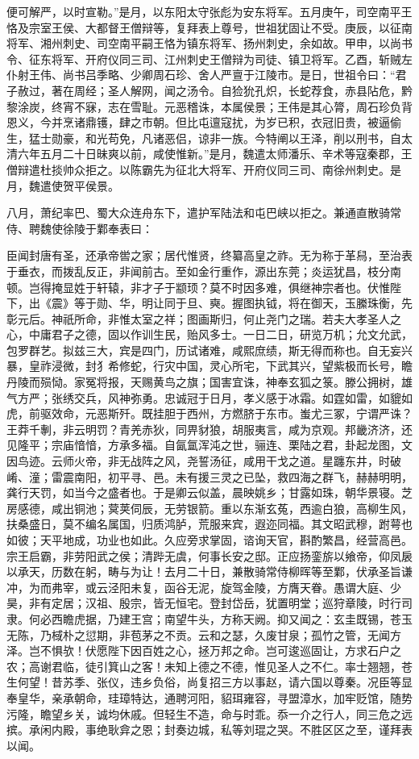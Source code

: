 \documentclass[12pt,UTF8]{ctexbook}
\begin{document}
便可解严，以时宣勒。”是月，以东阳太守张彪为安东将军。五月庚午，司空南平王恪及宗室王侯、大都督王僧辩等，复拜表上尊号，世祖犹固让不受。庚辰，以征南将军、湘州刺史、司空南平嗣王恪为镇东将军、扬州刺史，余如故。甲申，以尚书令、征东将军、开府仪同三司、江州刺史王僧辩为司徒、镇卫将军。乙酉，斩贼左仆射王伟、尚书吕季略、少卿周石珍、舍人严亶于江陵市。是日，世祖令曰：“君子赦过，著在周经；圣人解网，闻之汤令。自猃狁孔炽，长蛇荐食，赤县阽危，黔黎涂炭，终宵不寐，志在雪耻。元恶稽诛，本属侯景；王伟是其心膂，周石珍负背恩义，今并烹诸鼎镬，肆之市朝。但比屯邅寇扰，为岁已积，衣冠旧贵，被逼偷生，猛士勋豪，和光苟免，凡诸恶侣，谅非一族。今特阐以王泽，削以刑书，自太清六年五月二十日昧爽以前，咸使惟新。”是月，魏遣太师潘乐、辛术等寇秦郡，王僧辩遣杜掞帅众拒之。以陈霸先为征北大将军、开府仪同三司、南徐州刺史。是月，魏遣使贺平侯景。

八月，萧纪率巴、蜀大众连舟东下，遣护军陆法和屯巴峡以拒之。兼通直散骑常侍、聘魏使徐陵于鄴奉表曰：

臣闻封唐有圣，还承帝喾之家；居代惟贤，终纂高皇之祚。无为称于革舄，至治表于垂衣，而拨乱反正，非闻前古。至如金行重作，源出东莞；炎运犹昌，枝分南顿。岂得掩显姓于轩辕，非才子于颛顼？莫不时因多难，俱继神宗者也。伏惟陛下，出《震》等于勋、华，明让同于旦、奭。握图执钺，将在御天，玉縢珠衡，先彰元后。神祇所命，非惟太室之祥；图画斯归，何止尧门之瑞。若夫大孝圣人之心，中庸君子之德，固以作训生民，贻风多士。一日二日，研览万机；允文允武，包罗群艺。拟兹三大，宾是四门，历试诸难，咸熙庶绩，斯无得而称也。自无妄兴暴，皇祚浸微，封犭希修蛇，行灾中国，灵心所宅，下武其兴，望紫极而长号，瞻丹陵而殒恸。家冤将报，天赐黄鸟之旗；国害宜诛，神奉玄狐之箓。滕公拥树，雄气方严；张绣交兵，风神弥勇。忠诚冠于日月，孝义感于冰霜。如霆如雷，如貔如虎，前驱效命，元恶斯歼。既挂胆于西州，方燃脐于东市。蚩尤三冢，宁谓严诛？王莽千剸，非云明罚？青羌赤狄，同畀豺狼，胡服夷言，咸为京观。邦畿济济，还见隆平；宗庙愔愔，方承多福。自氤氲浑沌之世，骊连、栗陆之君，卦起龙图，文因鸟迹。云师火帝，非无战阵之风，尧誓汤征，咸用干戈之道。星躔东井，时破崤、潼；雷震南阳，初平寻、邑。未有援三灵之已坠，救四海之群飞，赫赫明明，龚行天罚，如当今之盛者也。于是卿云似盖，晨映姚乡；甘露如珠，朝华景寝。芝房感德，咸出铜池；蓂荚伺辰，无劳银箭。重以东渐玄菟，西逾白狼，高柳生风，扶桑盛日，莫不编名属国，归质鸿胪，荒服来宾，遐迩同福。其文昭武穆，跗萼也如彼；天平地成，功业也如此。久应旁求掌固，谘询天官，斟酌繁昌，经营高邑。宗王启霸，非劳阳武之侯；清跸无虞，何事长安之邸。正应扬銮旂以飨帝，仰凤扆以承天，历数在躬，畴与为让！去月二十日，兼散骑常侍柳晖等至鄴，伏承圣旨谦冲，为而弗宰，或云泾阳未复，函谷无泥，旋驾金陵，方膺天眷。愚谓大庭、少昊，非有定居；汉祖、殷宗，皆无恒宅。登封岱岳，犹置明堂；巡狩章陵，时行司隶。何必西瞻虎据，乃建王宫；南望牛头，方称天阙。抑又闻之：玄圭既锡，苍玉无陈，乃棫朴之愆期，非苞茅之不贡。云和之瑟，久废甘泉；孤竹之管，无闻方泽。岂不惧欤！伏愿陛下因百姓之心，拯万邦之命。岂可逡巡固让，方求石户之农；高谢君临，徒引箕山之客！未知上德之不德，惟见圣人之不仁。率士翘翘，苍生何望！昔苏季、张仪，违乡负俗，尚复招三方以事赵，请六国以尊秦。况臣等显奉皇华，亲承朝命，珪璋特达，通聘河阳，貂珥雍容，寻盟漳水，加牢贬馆，随势污隆，瞻望乡关，诚均休戚。但轻生不造，命与时乖。忝一介之行人，同三危之远摈。承闲内殿，事绝耿弇之恩；封奏边城，私等刘琨之哭。不胜区区之至，谨拜表以闻。
\end{document}
